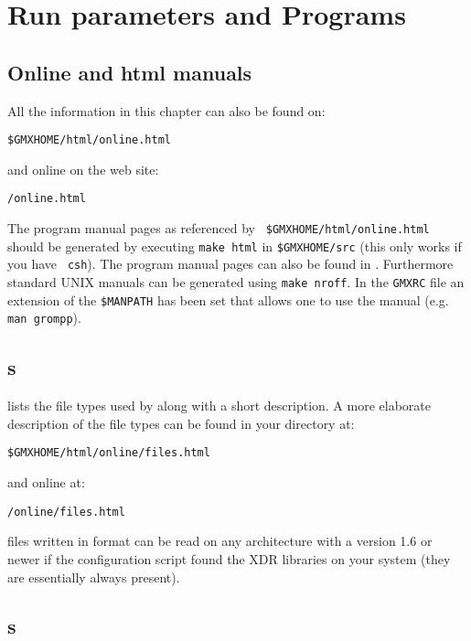 %
% 
% 
% 
% 
% 
% 
% 
% 
%

\chapter{Run parameters and Programs}
\label{ch:programs}

\section{Online and html manuals}
All the information in this chapter can also be found on:\\
\centerline{\tt \$GMXHOME/html/online.html}
and online on the {\gromacs} web site:\\
\centerline{\tt \wwwpage/online\gmxver.html}
The program manual pages as referenced by {\tt
\$GMXHOME/html/online.html} should be generated by executing {\tt make
html} in {\tt \$GMXHOME/src} (this only works if you have {\tt
csh}). The program manual pages can also be found in
. Furthermore standard UNIX manuals can be generated using
{\tt make nroff}. In the {\tt GMXRC} file an extension of the {\tt \$MANPATH} 
has been set that allows one to use the manual (e.g. {\tt man grompp}).

\section{s}
\label{sec:fileformats}
 lists the file types used by {\gromacs} along with
a short description. A more elaborate description of the file types can
be found in your {\gromacs} directory at:\\
\centerline{\tt \$GMXHOME/html/online/files.html}
and online at:\\
\centerline{\tt {\wwwpage}/online\gmxver/files.html}

{\gromacs} files written in  format can be read on any
architecture with a {\gromacs} version 1.6 or newer if the configuration
script found the XDR libraries on your system (they are essentially
always present).


\section{s}


\section{}

